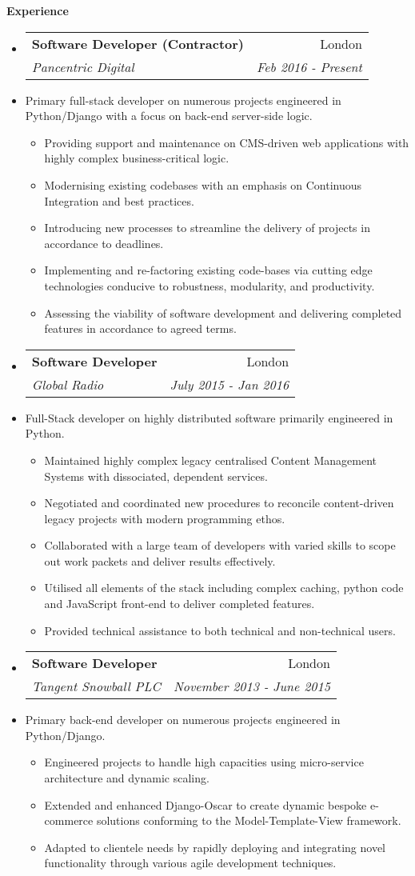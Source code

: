 \documentclass[letterpaper,11pt]{article}
\makeatletter
\newcommand{\resitem}[1]{\item #1 \vspace{-2pt}}
\newcommand{\resheading}[1]{{\large \colorbox{mygrey}
			{\begin{minipage}{\textwidth}
					{\textbf{#1 \vphantom{p\^{E}}}}
		\end{minipage}}}
	}
\newcommand{\ressubheading}[4]{
		\begin{tabular*}{180mm}{l@{\extracolsep{\fill}}r}
			\textbf{#1} & #2 \\
			\textit{#3} & \textit{#4} \\
		\end{tabular*}\vspace{-6pt}
	}
\newcommand{\resdescription}[1]{#1 \vspace{-0mm}}
\makeatother
\begin{document}
	\resheading{Experience}
	\begin{itemize}

		\item[]
            \ressubheading{Software Developer (Contractor)}{London}{Pancentric Digital}{Feb 2016 - Present}
		\item[]
			\resdescription{Primary full-stack developer on numerous projects engineered in Python/Django with a focus on back-end server-side logic.}
			\begin{itemize}
                    \resitem{Providing support and maintenance on CMS-driven web applications with highly complex business-critical logic.}
                    \resitem{Modernising existing codebases with an emphasis on Continuous Integration and best practices.}
					\resitem{Introducing new processes to streamline the delivery of projects in accordance to deadlines.}
					\resitem{Implementing and re-factoring existing code-bases via cutting edge technologies conducive to robustness, modularity, and productivity.}
					\resitem{Assessing the viability of software development and delivering completed features in accordance to agreed terms.}
			\end{itemize}
		\item[]
			\ressubheading{Software Developer}{London}{Global Radio}{July 2015 - Jan 2016}
		\item[]
			\resdescription{Full-Stack developer on highly distributed software primarily engineered in Python.}
			\begin{itemize}
					\resitem{Maintained highly complex legacy centralised Content Management Systems with dissociated, dependent services.}
					\resitem{Negotiated and coordinated new procedures to reconcile content-driven legacy projects with modern programming ethos.}
					\resitem{Collaborated with a large team of developers with varied skills to scope out work packets and deliver results effectively.}
					\resitem{Utilised all elements of the stack including complex caching, python code and JavaScript front-end to deliver completed features.}
					\resitem{Provided technical assistance to both technical and non-technical users.}
			\end{itemize}


		\item[]
			\ressubheading{Software Developer}{London}{Tangent Snowball PLC}{November 2013 - June 2015}
		\item[]
			\resdescription{Primary back-end developer on numerous projects engineered in Python/Django.}
			\begin{itemize}
					\resitem{Engineered projects to handle high capacities using micro-service architecture and dynamic scaling.}
					\resitem{Extended and enhanced Django-Oscar to create dynamic bespoke e-commerce solutions conforming to the Model-Template-View framework.}
					\resitem{Adapted to clientele needs by rapidly deploying and integrating novel functionality through various agile development techniques.}
			\end{itemize}


\end{itemize}
\end{document}
